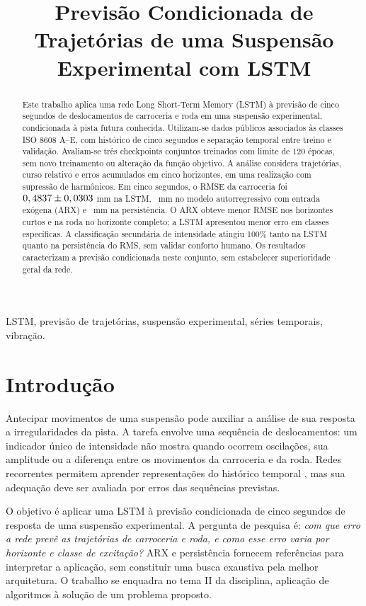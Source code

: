 \documentclass[conference]{IEEEtran}
\title{Previsão Condicionada de Trajetórias de uma Suspensão Experimental com LSTM}
\author{\IEEEauthorblockN{Pedro Druck Montalvão Reis}
\IEEEauthorblockA{Engenharia de Software\\Universidade de Brasília (UnB)\\Brasília, Brasil\\pedrodmreis@gmail.com}
\and\IEEEauthorblockN{Felipe Tedesco Horta}
\IEEEauthorblockA{Engenharia Automotiva\\Universidade de Brasília (UnB)\\Brasília, Brasil\\TedescoHF19@gmail.com}}
\begin{document}
\maketitle
\begin{abstract}
Este trabalho aplica uma rede Long Short-Term Memory (LSTM) à previsão de cinco segundos de deslocamentos de carroceria e roda em uma suspensão experimental, condicionada à pista futura conhecida. Utilizam-se dados públicos associados às classes ISO 8608 A--E, com histórico de cinco segundos e separação temporal entre treino e validação. Avaliam-se três checkpoints conjuntos treinados com limite de 120 épocas, sem novo treinamento ou alteração da função objetivo. A análise considera trajetórias, curso relativo e erros acumulados em cinco horizontes, em uma realização com supressão de harmônicos. Em cinco segundos, o RMSE da carroceria foi $0,4837\pm0,0303$ mm na LSTM, \BodyARXRMSE~mm no modelo autorregressivo com entrada exógena (ARX) e \BodyPersistenceRMSE~mm na persistência. O ARX obteve menor RMSE nos horizontes curtos e na roda no horizonte completo; a LSTM apresentou menor erro em classes específicas. A classificação secundária de intensidade atingiu 100\% tanto na LSTM quanto na persistência do RMS, sem validar conforto humano. Os resultados caracterizam a previsão condicionada neste conjunto, sem estabelecer superioridade geral da rede.
\end{abstract}
\begin{IEEEkeywords}
LSTM, previsão de trajetórias, suspensão experimental, séries temporais, vibração.
\end{IEEEkeywords}

\section{Introdução}
Antecipar movimentos de uma suspensão pode auxiliar a análise de sua resposta a irregularidades da pista. A tarefa envolve uma sequência de deslocamentos: um indicador único de intensidade não mostra quando ocorrem oscilações, sua amplitude ou a diferença entre os movimentos da carroceria e da roda. Redes recorrentes permitem aprender representações do histórico temporal \cite{lstm,goodfellow}, mas sua adequação deve ser avaliada por erros das sequências previstas.

O objetivo é aplicar uma LSTM à previsão condicionada de cinco segundos de resposta de uma suspensão experimental. A pergunta de pesquisa é: \emph{com que erro a rede prevê as trajetórias de carroceria e roda, e como esse erro varia por horizonte e classe de excitação?} ARX e persistência fornecem referências para interpretar a aplicação, sem constituir uma busca exaustiva pela melhor arquitetura. O trabalho se enquadra no tema II da disciplina, aplicação de algoritmos à solução de um problema proposto.
\end{document}
